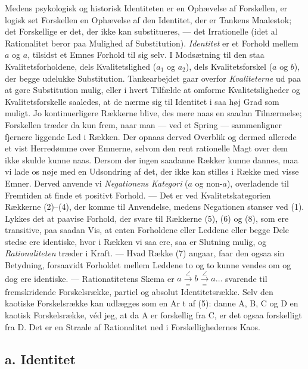 \documentclass[12pt,a4paper]{book}
\newcommand{\opage}[1]{\marginnote{\footnotesize\textit{[#1]}}}
\begin{document}
Medens psykologisk og historisk Identiteten er en Ophævelse af
Forskellen, er logisk set Forskellen en Ophævelse af den Identitet, der
er Tankens Maalestok; det Forskellige er det, der ikke kan
substitueres, --- det Irrationelle (idet al Rationalitet beror paa
Mulighed af Substitution). \emph{Identitet} er et Forhold mellem $a$ og
$a$, tilsidst et Emnes Forhold til sig selv. I Modsætning til den staa
Kvalitetsforholdene, dels Kvalitetslighed ($a_1$ og $a_2$), dels
Kvalitetsforskel ($a$ og $b$), der begge udelukke Substitution.
Tankearbejdet gaar overfor \emph{Kvaliteterne} ud paa at gøre
Substitution mulig, eller i hvert Tilfælde at omforme Kvalitetsligheder
og Kvalitetsforskelle saaledes, at de nærme sig til Identitet i saa høj
Grad som muligt. Jo kontinuerligere Rækkerne blive, des mere naas en saadan Tilnærmelse; Forskellen træder da kun frem, naar man --- ved et
Spring --- sammenligner fjernere liggende Led i Rækken. Der opnaas
derved Overblik og dermed allerede et vist Herredømme over Emnerne,
selvom den rent rationelle Magt over dem ikke skulde kunne naas. Dersom
der ingen saadanne Rækker kunne dannes, maa vi lade os nøje med en
Udsondring af det, der ikke kan stilles i Række med visse Emner. Derved
anvende vi \emph{Negationens Kategori} ($a$ og non-$a$), overladende
til Fremtiden at finde et positivt Forhold. --- Det er ved
Kvalitetskategorien Rækkerne (2)--(4), der komme til Anvendelse, medens
Negationen stanser ved (1). Lykkes det at paavise Forhold, der svare til
Rækkerne (5), (6) og (8), som ere transitive, paa saadan Vis, at enten
Forholdene eller Leddene eller begge Dele stedse ere identiske, hvor i
Rækken vi saa ere, saa er Slutning mulig, og \emph{Rationaliteten}
træder i Kraft. --- Hvad Række (7) angaar, faar den ogsaa sin Betydning,
forsaavidt Forholdet mellem Leddene to og to kunne vendes om og dog ere
identiske. --- Rationatitetens Skema er $a \overset{\angle}{\underset{=}{\to}}
b \overset{\angle}{\underset{=}{\to}} a \ldots$ svarende til
fremskridende Forskelsrække, partiel og absolut Identitetsrække. Selv
den kaotiske Forskelsrække kan udlægges som en Ar%
\opage{177}t af (5): danne A, B,
C og D en kaotisk Forskelsrække, véd jeg, at da A er forskellig fra C,
er det ogsaa forskelligt fra D. Det er en Straale af Rationalitet ned i
Forskellighedernes Kaos.

\subsection*{a. Identitet}
\end{document}
